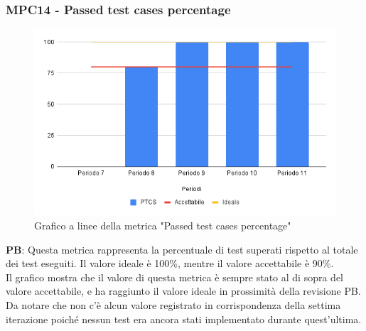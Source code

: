 \documentclass[10pt]{article}
\begin{document}
\begin{justify}
\subsubsection{MPC14 - Passed test cases percentage}

\begin{figure}[H]
  \centering
  \includegraphics[width=0.9\linewidth]{PTCP.png}
  \caption{Grafico a linee della metrica "Passed test cases percentage"}
\end{figure}

\textbf{PB}: Questa metrica rappresenta la percentuale di test superati rispetto al totale dei test eseguiti. Il valore ideale è 100\%, mentre il valore accettabile è 90\%.\\
Il grafico mostra che il valore di questa metrica è sempre stato al di sopra del valore accettabile, e ha raggiunto il valore ideale in prossimità della revisione PB.\\
Da notare che non c'è alcun valore registrato in corrispondenza della settima iterazione poiché nessun test era ancora stati implementato durante quest'ultima.\\

\end{justify}
\end{document}
